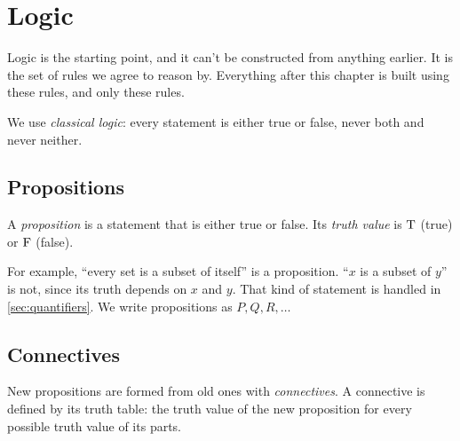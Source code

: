 \chapter{Logic}
\label{ch:logic}

Logic is the starting point, and it can't be constructed from anything earlier.
It is the set of rules we agree to reason by. Everything after this chapter is
built using these rules, and only these rules.

We use \emph{classical logic}: every statement is either true or false, never
both and never neither.

\section{Propositions}

\begin{definition}[Proposition]
\label{def:proposition}
A \emph{proposition} is a statement that is either true or false. Its \emph{truth
value} is $\mathrm{T}$ (true) or $\mathrm{F}$ (false).
\end{definition}

For example, \enquote{every set is a subset of itself} is a proposition.
\enquote{$x$ is a subset of $y$} is not, since its truth depends on $x$ and $y$.
That kind of statement is handled in \cref{sec:quantifiers}. We write propositions
as $P, Q, R, \dots$

\section{Connectives}

New propositions are formed from old ones with \emph{connectives}. A connective is
defined by its truth table: the truth value of the new proposition for every
possible truth value of its parts.


